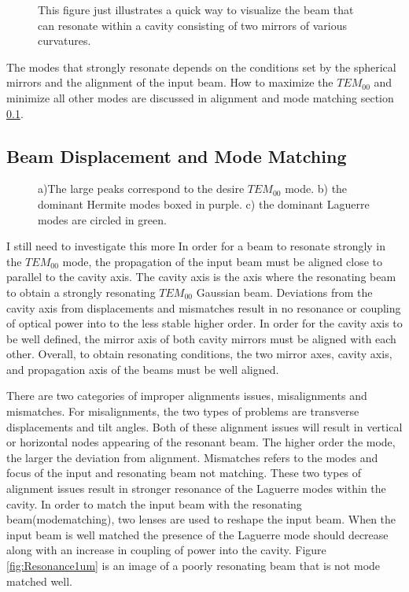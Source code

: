 \documentclass[a4paper]{book}
\newcommand{\imginput}[1]{} %
\begin{document}
			\begin{figure} [!ht]
				\centering
				\def\svgwidth{\columnwidth}
				\resizebox{160mm}{!}{\imginput{images/cav-types.pdf_tex}}
				\caption{This figure just illustrates a quick way to visualize the beam that can resonate within a cavity consisting of two mirrors of various curvatures.
				}
				\label{fig:cav-types}
			\end{figure}	
			
			The modes that strongly resonate depends on the conditions set by the spherical mirrors and the alignment of the input beam.
			How to maximize the $TEM_{00}$ and minimize all other modes are discussed in alignment and mode matching section \ref{sssec:AlignModeMatch}.
		
		\subsection {Beam Displacement and Mode Matching}
			\label{sssec:AlignModeMatch}
			
			\begin{figure} [!ht]
				\centering
				\def\svgwidth{\columnwidth}
				\resizebox{150mm}{!}{\imginput{images/cav-1um-output.pdf_tex}}
				\caption{a)The large peaks correspond to the desire $TEM_{00}$ mode. b) the dominant Hermite modes boxed in purple. c) the dominant Laguerre modes are circled in green.
				}
				\label{fig:cav-1um-output}
			\end{figure}		
			I still need to investigate this more
			In order for a beam to resonate strongly in the $TEM_{00}$ mode, the propagation of the input beam must be aligned close to parallel to the cavity axis.
			The cavity axis is the axis where the resonating beam to obtain a strongly resonating $TEM_{00}$ Gaussian beam. Deviations from the cavity axis from displacements and mismatches result in no resonance or coupling of optical power into to the less stable higher order. In order for the cavity axis to be well defined, the mirror axis of both cavity mirrors must be aligned with each other. Overall, to obtain resonating conditions, the two mirror axes, cavity axis, and propagation axis of the beams must be well aligned.
			
			There are two categories of improper alignments issues, misalignments and mismatches. For misalignments, the two types of problems are transverse displacements and tilt angles. Both of these alignment issues will result in vertical or horizontal nodes appearing of the resonant beam. The higher order the mode, the larger the deviation from alignment. 
			Mismatches refers to the modes and focus of the input and resonating beam not matching. These two types of alignment issues result in stronger resonance of the Laguerre modes within the cavity. In order to match the input beam with the resonating beam(modematching), two lenses are used to reshape the input beam. When the input beam is well matched the presence of the Laguerre mode should decrease along with an increase in coupling of power into the cavity. Figure \ref{fig:Resonance1um} is an image of a poorly resonating beam that is not mode matched well. 
\end{document}

